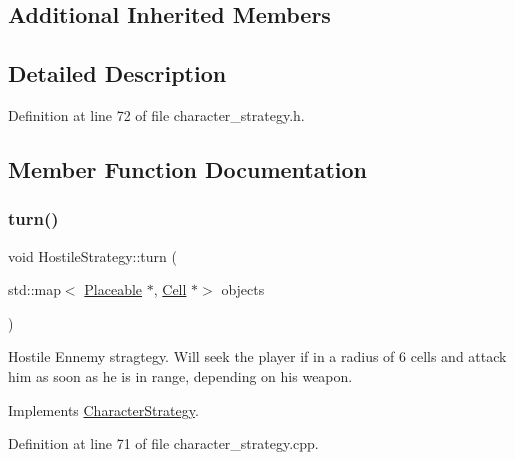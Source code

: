 \subsection*{Additional Inherited Members}


\subsection{Detailed Description}


Definition at line 72 of file character\+\_\+strategy.\+h.



\subsection{Member Function Documentation}
\hypertarget{class_hostile_strategy_aaca0f223b92c48cb9b6b412b26fde34f}{}\label{class_hostile_strategy_aaca0f223b92c48cb9b6b412b26fde34f} 
\subsubsection{\texorpdfstring{turn()}{turn()}}
{\footnotesize\ttfamily void Hostile\+Strategy\+::turn (\begin{DoxyParamCaption}\item[{std\+::map$<$ \hyperlink{class_placeable}{Placeable} $\ast$, \hyperlink{class_cell}{Cell} $\ast$$>$}]{objects }\end{DoxyParamCaption})\hspace{0.3cm}{\ttfamily [virtual]}}

Hostile Ennemy stragtegy. Will seek the player if in a radius of 6 cells and attack him as soon as he is in range, depending on his weapon. 

Implements \hyperlink{class_character_strategy}{Character\+Strategy}.



Definition at line 71 of file character\+\_\+strategy.\+cpp.


